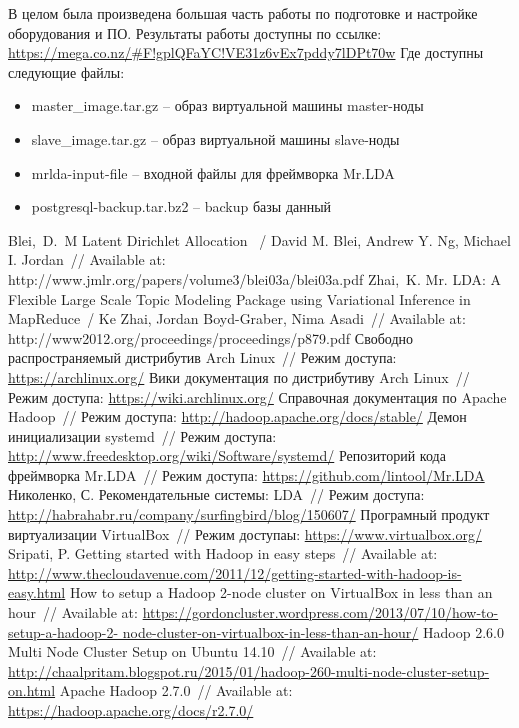 В целом была произведена большая часть работы по подготовке и настройке оборудования и ПО. Результаты 
работы доступны по ссылке:\\
\url{https://mega.co.nz/#F!gplQFaYC!VE31z6vEx7pddy7lDPt70w}
Где доступны следующие файлы:
\begin{itemize}
    \item master\_image.tar.gz -- образ виртуальной машины master-ноды
    \item slave\_image.tar.gz -- образ виртуальной машины slave-ноды
    \item mrlda-input-file -- входной файлы для фреймворка Mr.LDA
    \item postgresql-backup.tar.bz2 -- backup базы данный
\end{itemize}

\newpage

\renewcommand{\bibname}{Список используемой литературы}
\begin{thebibliography}{10}
     Blei,~D.~M Latent Dirichlet Allocation ~/ David M. Blei, Andrew Y. Ng, 
        Michael I. Jordan~// Available at: http://www.jmlr.org/papers/volume3/blei03a/blei03a.pdf
     Zhai,~K. Mr. LDA: A Flexible Large Scale Topic Modeling Package using Variational 
        Inference in MapReduce~/ Ke Zhai, Jordan Boyd-Graber, Nima Asadi~//
        Available at: http://www2012.org/proceedings/proceedings/p879.pdf
     Свободно распространяемый дистрибутив Arch Linux~// Режим доступа:
        \url{https://archlinux.org/}
     Вики документация по дистрибутиву Arch Linux~// Режим доступа:
        \url{https://wiki.archlinux.org/}
     Справочная документация по Apache Hadoop~// Режим доступа:
        \url{http://hadoop.apache.org/docs/stable/}
     Демон инициализации systemd~// Режим доступа:
        \url{http://www.freedesktop.org/wiki/Software/systemd/}
     Репозиторий кода фреймворка Mr.LDA~// Режим доступа:
        \url{https://github.com/lintool/Mr.LDA}
     Николенко, С. Рекомендательные системы: LDA~// Режим доступа:
        \url{http://habrahabr.ru/company/surfingbird/blog/150607/}
     Програмный продукт виртуализации VirtualBox~// Режим доступаы:
        \url{https://www.virtualbox.org/}
     Sripati, P. Getting started with Hadoop in easy steps~// Available at:
        \url{http://www.thecloudavenue.com/2011/12/getting-started-with-hadoop-is-easy.html}
     How to setup a Hadoop 2-node cluster on VirtualBox in less than an hour~//
        Available at: \url{https://gordoncluster.wordpress.com/2013/07/10/how-to-setup-a-hadoop-2-
        node-cluster-on-virtualbox-in-less-than-an-hour/}
     Hadoop 2.6.0 Multi Node Cluster Setup on Ubuntu 14.10~// Available at:
        \url{http://chaalpritam.blogspot.ru/2015/01/hadoop-260-multi-node-cluster-setup-on.html}
     Apache Hadoop 2.7.0~// Available at:
        \url{https://hadoop.apache.org/docs/r2.7.0/}
\end{thebibliography}